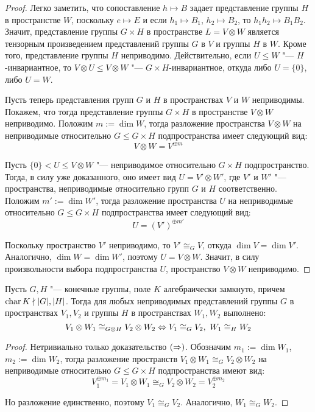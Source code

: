 \begin{proof}
	Легко заметить, что сопоставление $h \mapsto B$ задает представление группы $H$ в пространстве $W$, поскольку $e \mapsto E$ и если $h_1 \mapsto B_1$, $h_2 \mapsto B_2$, то $h_1h_2 \mapsto B_1B_2$. Значит, представление группы $G \times H$ в пространстве $L = V \otimes W$ является тензорным произведением представлений группы $G$ в $V$ и группы $H$ в $W$. Кроме того, представление группы $H$ неприводимо. Действительно, если $U \le W$ "--- $H$-инвариантное, то $V \otimes U \le V \otimes W$ "--- $G \times H$-инвариантное, откуда либо $U = \{0\}$, либо $U = W$.
	
	Пусть теперь представления групп $G$ и $H$ в пространствах $V$ и $W$ неприводимы. Покажем, что тогда представление группы $G \times H$ в пространстве $V \otimes W$ неприводимо. Положим $m := \dim{W}$, тогда разложение пространства $V \otimes W$ на неприводимые относительно $G \le G \times H$ подпространства имеет следующий вид:
	\[V \otimes W = V^{\oplus m}\]
	
	Пусть $\{0\} < U \le V \otimes W$ "--- неприводимое относительно $G \times H$ подпространство. Тогда, в силу уже доказанного, оно имеет вид $U = V' \otimes W'$, где $V'$ и $W'$ "--- пространства, неприводимые относительно групп $G$ и $H$ соответственно. Положим $m' := \dim{W'}$, тогда разложение пространства $U$ на неприводимые относительно $G \le G \times H$ подпространства имеет следующий вид:
	\[U = (V')^{\oplus m'}\]
	
	Поскольку пространство $V'$ неприводимо, то $V' \cong_G V$, откуда $\dim{V} = \dim{V'}$. Аналогично, $\dim{W} = \dim{W'}$, поэтому $U = V \otimes W$. Значит, в силу произвольности выбора подпространства $U$, пространство $V \otimes W$ неприводимо.
\end{proof}

\begin{theorem}
	Пусть $G, H$ "--- конечные группы, поле $K$ алгебраически замкнуто, причем $\operatorname{char}{K} \nmid |G|, |H|$. Тогда для любых неприводимых представлений группы $G$ в пространствах $V_1, V_2$ и группы $H$ в пространствах $W_1, W_2$ выполнено:
	\[V_1 \otimes W_1 \cong_{G \otimes H} V_2 \otimes W_2 \Leftrightarrow V_1 \cong_G V_2,~ W_1\cong_H W_2\]
\end{theorem}

\begin{proof}
	Нетривиально только доказательство $(\Rightarrow)$. Обозначим $m_1 := \dim{W_1}$, $m_2 := \dim{W_2}$, тогда разложение пространств $V_1 \otimes W_1 \cong_G V_2 \otimes W_2$ на неприводимые относительно $G \le G \times H$ подпространства имеют вид:
	\[V_1^{\oplus m_1} = V_1 \otimes W_1 \cong_G V_2 \otimes W_2 = V_2^{\oplus m_2}\]
	
	Но разложение единственно, поэтому $V_1 \cong_G V_2$. Аналогично, $W_1 \cong_G W_2$.
\end{proof}